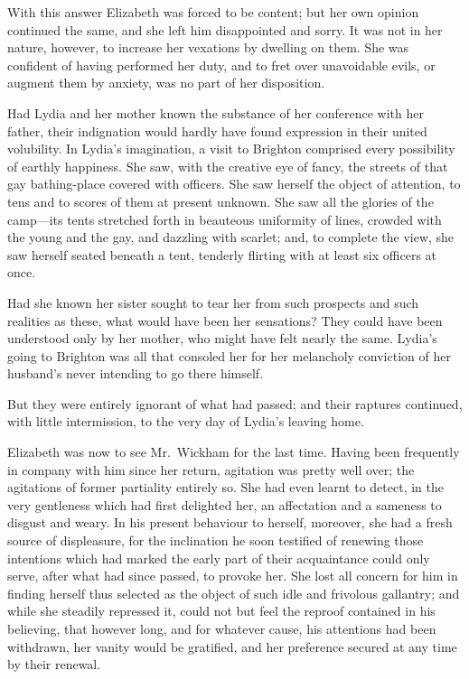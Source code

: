 \documentclass[12pt,english,oneside]{book}
\begin{document}
With this answer Elizabeth was forced to be content; but her own opinion
continued the same, and she left him disappointed and sorry. It was
not in her nature, however, to increase her vexations by dwelling
on them. She was confident of having performed her duty, and to fret
over unavoidable evils, or augment them by anxiety, was no part of
her disposition.

Had Lydia and her mother known the substance of her conference with
her father, their indignation would hardly have found expression in
their united volubility. In Lydia's imagination, a visit to Brighton
comprised every possibility of earthly happiness. She saw, with the
creative eye of fancy, the streets of that gay bathing-place covered
with officers. She saw herself the object of attention, to tens and
to scores of them at present unknown. She saw all the glories of the
camp\mbox{---}its tents stretched forth in beauteous uniformity of
lines, crowded with the young and the gay, and dazzling with scarlet;
and, to complete the view, she saw herself seated beneath a tent,
tenderly flirting with at least six officers at once.

Had she known her sister sought to tear her from such prospects and
such realities as these, what would have been her sensations? They
could have been understood only by her mother, who might have felt
nearly the same. Lydia's going to Brighton was all that consoled her
for her melancholy conviction of her husband's never intending to
go there himself.

But they were entirely ignorant of what had passed; and their raptures
continued, with little intermission, to the very day of Lydia's leaving
home.

Elizabeth was now to see Mr.\ Wickham for the last time. Having been
frequently in company with him since her return, agitation was pretty
well over; the agitations of former partiality entirely so. She had
even learnt to detect, in the very gentleness which had first delighted
her, an affectation and a sameness to disgust and weary. In his present
behaviour to herself, moreover, she had a fresh source of displeasure,
for the inclination he soon testified of renewing those intentions
which had marked the early part of their acquaintance could only serve,
after what had since passed, to provoke her. She lost all concern
for him in finding herself thus selected as the object of such idle
and frivolous gallantry; and while she steadily repressed it, could
not but feel the reproof contained in his believing, that however
long, and for whatever cause, his attentions had been withdrawn, her
vanity would be gratified, and her preference secured at any time
by their renewal.
\end{document}

